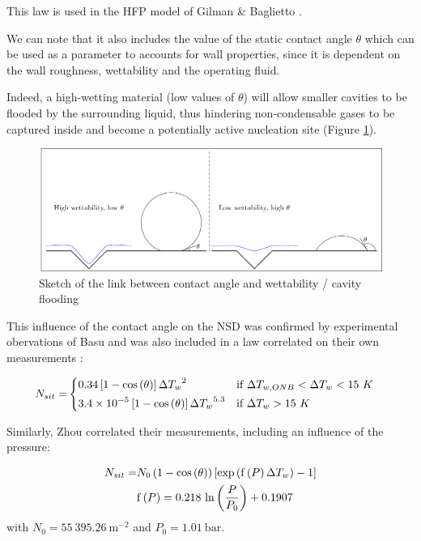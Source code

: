 \begin{remark*}{}
This law is used in the HFP model of Gilman \& Baglietto \cite{gilman_baglietto}.
\end{remark*}

We can note that it also includes the value of the static contact angle $\theta$ which can be used as a parameter to accounts for wall properties, since it is dependent on the wall roughness, wettability and the operating fluid. 

Indeed, a high-wetting material (low values of $\theta$) will allow smaller cavities to be flooded by the surrounding liquid, thus hindering non-condensable gases to be captured inside and become a potentially active nucleation site (Figure \ref{fig:nsd_theta_wet}).

\begin{figure}[h!]
\centering
\includegraphics[scale=0.8]{img/NSD/wettability.pdf}
\caption{Sketch of the link between contact angle and wettability / cavity flooding}
\label{fig:nsd_theta_wet}
\end{figure}

This influence of the contact angle on the NSD was confirmed by experimental obervations of Basu \etal \cite{basu_nsit} and was also included in a law correlated on their own measurements :

\begin{align}
N_{sit}=&
\begin{dcases}
0.34\left[ 1-\mathrm{cos}\left( \theta \right) \right] {\Delta T_{w}}^{2} & \text{if } \Delta T_{w,ONB}<\Delta T_{w} < 15\ K\\
3.4\times 10^{-5}\left[ 1-\mathrm{cos}\left( \theta \right) \right] {\Delta T_{w}}^{5.3} & \text{if } \Delta T_{w} > 15\ K
\end{dcases}
\label{eq:nsit_basu}
\end{align}

\npar

Similarly, Zhou \etal \cite{zhou_nsd} correlated their measurements, including an influence of the pressure:

\begin{align}
N_{sit} =& N_{0}\left( 1-\mathrm{cos}\left( \theta \right) \right)\left[ \mathrm{exp}\left( \mathrm{f}\left( P \right) \Delta T_{w}  \right) -1  \right]
\label{eq:nsit_zhou}\\
&\mathrm{f}\left( P \right) = 0.218~\mathrm{ln}\left( \dfrac{P}{P_{0}} \right)+0.1907
\end{align}
with $N_{0}=55~395.26\ \mathrm{m}^{-2}$ and $P_{0}=1.01\ \mathrm{bar}$.

